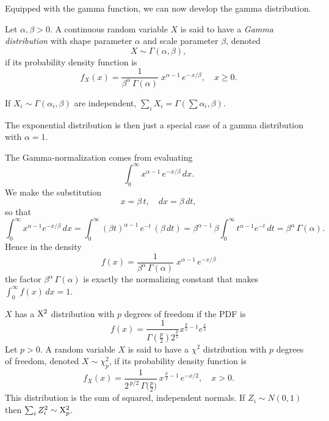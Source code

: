 \documentclass[10pt]{article}
\begin{document}
Equipped with the gamma function, we can now develop the gamma distribution.

\begin{definition}
  Let $\alpha,\beta>0$. A continuous random variable $X$ is said to have a
  \emph{Gamma distribution} with shape parameter $\alpha$ and scale parameter
  $\beta$, denoted
  \[
    X \sim \Gamma(\alpha, \beta),
  \]
  if its probability density function is
  \[
    f_X(x)
    = \frac{1}{\beta^{\alpha}\,\Gamma(\alpha)} \; x^{\alpha - 1} \, e^{-\,x/\beta},
    \quad x \ge 0.
  \]

  If $X_i \sim \Gamma(\alpha_i, \beta)$ are independent, $\sum_i X_i =
  \Gamma(\sum \alpha_i, \beta)$.
\end{definition}

The exponential distribution is then just a special case of a gamma
distribution with $\alpha = 1$.

\begin{note}
The Gamma‐normalization comes from evaluating
\[
  \int_{0}^{\infty} x^{\alpha-1} \,e^{-x/\beta}\,dx.
\]
We make the substitution
\[
  x = \beta\,t,\quad dx = \beta\,dt,
\]
so that
\[
  \int_{0}^{\infty} x^{\alpha-1} e^{-x/\beta}\,dx
  = \int_{0}^{\infty} (\beta t)^{\alpha-1}\,e^{-t}\,(\beta\,dt)
  = \beta^{\alpha-1}\,\beta
    \int_{0}^{\infty} t^{\alpha-1} e^{-t}\,dt
  = \beta^{\alpha}\,\Gamma(\alpha).
\]
Hence in the density
\[
  f(x) = \frac{1}{\beta^\alpha\,\Gamma(\alpha)}\;x^{\alpha-1}\,e^{-x/\beta}
\]
the factor \(\beta^\alpha\,\Gamma(\alpha)\) is exactly the normalizing constant
that makes \(\int_0^\infty f(x)\,dx=1\).  
\end{note}

\begin{definition}
    $X$ has a $\mathrm{X}^2$ distribution with $p$ degrees of freedom if the PDF is
    \[
        f(x) =
        \frac{1}{\Gamma(\frac{p}{2})2^{\frac{p}{2}}}x^{\frac{p}{2}-1}e^{\frac{x}{2}}
    \]
    Let $p>0$. A random variable $X$ is said to have a $\chi^2$ distribution with 
    $p$ degrees of freedom, denoted $X \sim \chi^2_p$, if its probability density 
    function is
    \[
      f_X(x)
      = \frac{1}{2^{\,p/2}\,\Gamma\bigl(\tfrac{p}{2}\bigr)}\,
        x^{\,\tfrac{p}{2}-1}\,e^{-x/2},
      \quad x > 0.
    \]
    This distribution is the sum of squared, independent normals. If $Z_i \sim
    N(0, 1)$ then $\sum_i Z_i^2 \sim \mathrm{X}_p^2$.
\end{definition}

\end{document}
